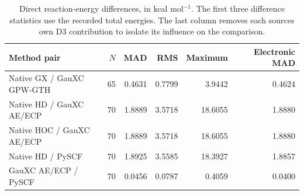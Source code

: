 \begin{table}[htbp]
\centering\small
\caption{Direct reaction-energy differences, in kcal mol$^{-1}$. The first three difference statistics use the recorded total energies. The last column removes each source\textquotesingle s own D3 contribution to isolate its influence on the comparison.}\label{tab:interface-pairs}
\begin{tabular}{lrrrrr}
\toprule
Method pair & $N$ & MAD & RMS & Maximum & Electronic MAD\\
\midrule
Native GX / GauXC GPW-GTH & 65 & 0.4631 & 0.7799 & 3.9442 & 0.4624 \\
Native HD / GauXC AE/ECP & 70 & 1.8889 & 3.5718 & 18.6055 & 1.8880 \\
Native HOC / GauXC AE/ECP & 70 & 1.8889 & 3.5718 & 18.6055 & 1.8880 \\
Native HD / PySCF & 70 & 1.8925 & 3.5585 & 18.3927 & 1.8857 \\
GauXC AE/ECP / PySCF & 70 & 0.0456 & 0.0787 & 0.4059 & 0.0400 \\
\bottomrule
\end{tabular}
\end{table}
